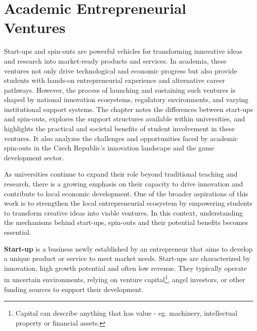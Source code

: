 \chapter{Academic Entrepreneurial Ventures}

\begin{chapterabstract}
	Start-ups and spin-outs are powerful vehicles for transforming innovative ideas and research into market-ready products and services. In academia, these ventures not only drive technological and economic progress but also provide students with hands-on entrepreneurial experience and alternative career pathways. However, the process of launching and sustaining such ventures is shaped by national innovation ecosystems, regulatory environments, and varying institutional support systems. The chapter notes the differences between start-ups and spin-outs, explores the support structures available within universities, and highlights the practical and societal benefits of student involvement in these ventures. It also analyzes the challenges and opportunities faced by academic spin-outs in the Czech Republic’s innovation landscape and the game development sector.
\end{chapterabstract}

As universities continue to expand their role beyond traditional teaching and research, there is a growing emphasis on their capacity to drive innovation and contribute to local economic development. One of the broader aspirations of this work is to strengthen the local entrepreneurial ecosystem by empowering students to transform creative ideas into viable ventures. In this context, understanding the mechanisms behind start-ups, spin-outs and their potential benefits becomes essential.

\textbf{Start-up} is a business newly established by an entrepreneur that aims to develop a unique product or service to meet market needs. Start-ups are characterized by innovation, high growth potential and often low revenue. They typically operate in uncertain environments, relying on venture capital\footnote{Capital can describe anything that has value - eg. machinery, intellectual property or financial assets.}, angel investors, or other funding sources to support their development.

